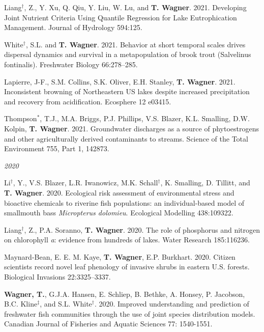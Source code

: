 \documentclass[10pt]{article}
\begin{document}
\begin{flushleft}
\begin{etaremune}[start=114]
\item Liang$^\dagger$, Z., Y. Xu, Q. Qiu, Y. Liu, W. Lu, and \textbf{T. Wagner}.  2021. Developing Joint Nutrient Criteria Using Quantile Regression for Lake Eutrophication Management. Journal of Hydrology 594:125.


\item White$^\dagger$, S.L. and \textbf{T. Wagner}.  2021. Behavior at short temporal scales drives dispersal dynamics and survival in a metapopulation of brook trout (Salvelinus fontinalis). Freshwater Biology 66:278–285.


\item Lapierre, J-F., S.M. Collins, S.K. Oliver, E.H. Stanley, \textbf{T. Wagner}. 2021.  Inconsistent browning of Northeastern US lakes despite increased precipitation and recovery from acidification. Ecosphere 12 e03415.

\item Thompson$^*$, T.J., M.A. Briggs, P.J. Phillips, V.S. Blazer, K.L. Smalling, D.W. Kolpin, \textbf{T. Wagner}.  2021. Groundwater discharges as a source of phytoestrogens and other agriculturally derived contaminants to streams. Science of the Total Environment 755, Part 1, 142873.

\end{etaremune}

\vspace{5pt}
\emph{2020}
\begin{etaremune}[start=103]


\item Li$^\dagger$, Y., V.S. Blazer, L.R. Iwanowicz, M.K. Schall$^\dagger$, K. Smalling, D. Tillitt, and \textbf{T. Wagner}. 2020. Ecological risk assessment of environmental stress and bioactive chemicals to riverine fish populations: an individual-based model of smallmouth bass \textit{Micropterus dolomieu}. Ecological Modelling 438:109322.

\item Liang$^\dagger$, Z., P.A. Soranno, \textbf{T. Wagner}. 2020. The role of phosphorus and nitrogen on chlorophyll \textit{a}: evidence from hundreds of lakes. Water Research 185:116236.

\item Maynard-Bean, E. E. M. Kaye, \textbf{T. Wagner}, E.P. Burkhart. 2020. Citizen scientists record novel leaf phenology of invasive shrubs in eastern U.S. forests. Biological Invasions 22:3325–3337.	

\item \textbf{Wagner, T.}, G.J.A. Hansen, E. Schliep, B. Bethke, A. Honsey, P. Jacobson, B.C. Kline$^\ddagger$, and S.L. White$^\dagger$. 2020. Improved understanding and prediction of freshwater fish communities through the use of joint species distribution models. Canadian Journal of Fisheries and Aquatic Sciences 77: 1540-1551.


\end{etaremune}
\end{flushleft}
\end{document}
